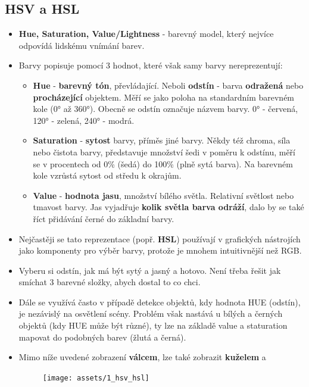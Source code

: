 \subsection{HSV a HSL}
\begin{itemize}
    \item \textbf{Hue, Saturation, Value/Lightness} - barevný model, který nejvíce odpovídá lidskému vnímání barev.
    \item Barvy popisuje pomocí 3 hodnot, které však samy barvy nereprezentují:
          \begin{itemize}
              \item \textbf{Hue} - \textbf{barevný tón}, převládající. Neboli \textbf{odstín} - barva \textbf{odražená} nebo \textbf{procházející} objektem. Měří se jako poloha na standardním barevném kole (\ang{0} až \ang{360}). Obecně se odstín označuje názvem barvy. \ang{0} - červená, \ang{120} - zelená, \ang{240} - modrá.
              \item \textbf{Saturation} - \textbf{sytost} barvy, příměs jiné barvy. Někdy též chroma, síla nebo čistota barvy, představuje množství šedi v poměru k odstínu, měří se v procentech od 0\% (šedá) do 100\% (plně sytá barva). Na barevném kole vzrůstá sytost od středu k okrajům.
              \item \textbf{Value} - \textbf{hodnota jasu}, množství bílého světla. Relativní světlost nebo tmavost barvy. Jas vyjadřuje \textbf{kolik světla barva odráží}, dalo by se také říct přidávání černé do základní barvy.
          \end{itemize}
    \item Nejčastěji se tato reprezentace (popř. \textbf{HSL}) používají v grafických nástrojích jako komponenty pro výběr barvy, protože je mnohem intuitivnější než RGB.
    \item Vyberu si odstín, jak má být sytý a jasný a hotovo. Není třeba řešit jak smíchat 3 barevné složky, abych dostal to co chci.
    \item Dále se využívá často v případě detekce objektů, kdy hodnota HUE (odstín), je nezávislý na osvětlení scény. Problém však nastává u bílých a černých objektů (kdy HUE může být různé), ty lze na základě value a staturation mapovat do podobných barev (žlutá a černá).
    \item Mimo níže uvedené zobrazení \textbf{válcem}, lze také zobrazit \textbf{kuželem} a
          \begin{figure}[H]
              \centering
              \texttt{[image: assets/1\_hsv\_hsl]}
          \end{figure}
\end{itemize}

